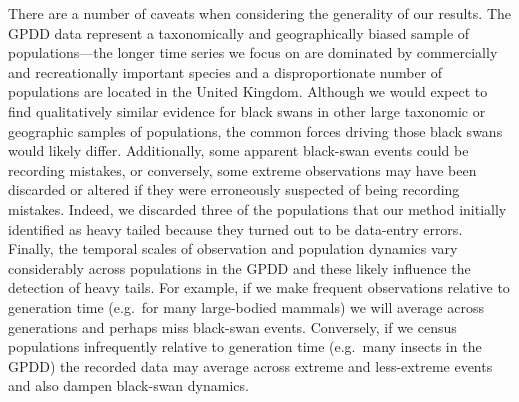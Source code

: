 There are a number of caveats when considering the generality of our results.
The GPDD data represent a taxonomically and geographically biased sample of
populations---the longer time series we focus on are dominated by commercially
and recreationally important species and a disproportionate number of
populations are located in the United Kingdom. Although we would expect to find
qualitatively similar evidence for black swans in other large taxonomic or
geographic samples of populations, the common forces driving those black swans
would likely differ. Additionally, some apparent black-swan events could be
recording mistakes, or conversely, some extreme observations may have been
discarded or altered if they were erroneously suspected of being recording
mistakes. Indeed, we discarded three of the populations that our method
initially identified as heavy tailed because they turned out to be data-entry
errors. Finally, the temporal scales of observation and population dynamics
vary considerably across populations in the GPDD and these likely influence the
detection of heavy tails. For example, if we make frequent observations
relative to generation time (e.g.~for many large-bodied mammals) we will
average across generations and perhaps miss black-swan events. Conversely, if
we census populations infrequently relative to generation time (e.g.~many
insects in the GPDD) the recorded data may average across extreme and
less-extreme events and also dampen black-swan dynamics.



